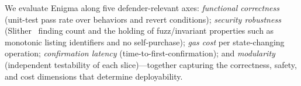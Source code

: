 We evaluate Enigma along five defender-relevant axes: \emph{functional correctness} (unit-test pass rate over behaviors and revert conditions); \emph{security robustness} (Slither~\cite{feist2019slither} finding count and the holding of fuzz/invariant properties such as monotonic listing identifiers and no self-purchase); \emph{gas cost} per state-changing operation; \emph{confirmation latency} (time-to-first-confirmation); and \emph{modularity} (independent testability of each slice)---together capturing the correctness, safety, and cost dimensions that determine deployability.
